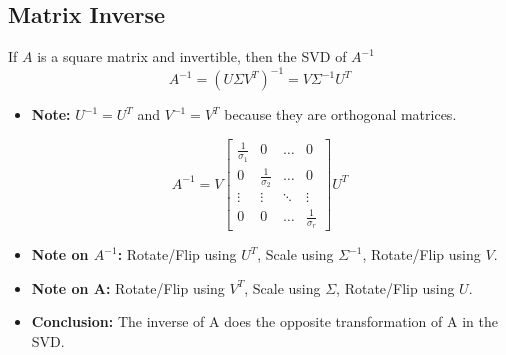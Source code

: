 \subsection{Matrix Inverse}
\begin{definition}
    If \( A \) is a square matrix and invertible, then the SVD of $A^{-1}$
    \begin{equation*}
    A^{-1} = (U \Sigma V^T)^{-1} = V \Sigma^{-1} U^T
    \end{equation*}
    \begin{itemize}
        \item \textbf{Note:} $U^{-1} = U^T$ and $V^{-1} = V^T$ because they are orthogonal matrices.
    \end{itemize}

    \begin{equation*}
    A^{-1} = V 
    \begin{bmatrix}
    \frac{1}{\sigma_1} & 0 & \ldots & 0 \\
    0 & \frac{1}{\sigma_2} & \ldots & 0 \\
    \vdots & \vdots & \ddots & \vdots \\
    0 & 0 & \ldots & \frac{1}{\sigma_r}
    \end{bmatrix}
    U^T
    \end{equation*}
    \begin{itemize}
        \item \textbf{Note on $A^{-1}$:} Rotate/Flip using \( U^T \), Scale using \( \Sigma^{-1} \), Rotate/Flip using \( V \).
        \item \textbf{Note on A:} Rotate/Flip using \( V^T \), Scale using \( \Sigma \), Rotate/Flip using \( U \).
        \item \textbf{Conclusion:} The inverse of A does the opposite transformation of A in the SVD.
    \end{itemize}
\end{definition}

